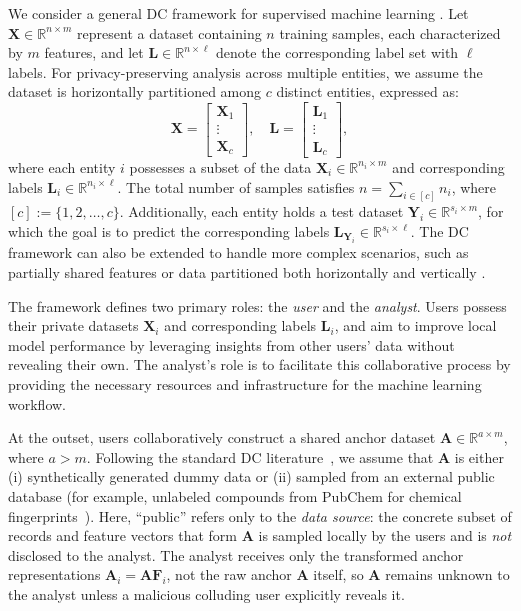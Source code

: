 \documentclass[final,3p,times]{elsarticle}
\theoremstyle{plain}
\newcommand{\matr}[1]{\bm{#1}}        %
\begin{document}
We consider a general DC framework for supervised machine learning \cite{DCframework1, DC-DP}. Let \( \matr{X} \in \mathbb{R}^{n \times m} \) represent a dataset containing \( n \) training samples, each characterized by \( m \) features, and let \( \matr{L} \in \mathbb{R}^{n \times \ell} \) denote the corresponding label set with \( \ell \) labels. For privacy-preserving analysis across multiple entities, we assume the dataset is horizontally partitioned among \( c \) distinct entities, expressed as:
\begin{equation}
\matr{X} = \begin{bmatrix}
\matr{X}_1 \\
\vdots \\
\matr{X}_c
\end{bmatrix}, \quad
\matr{L} = \begin{bmatrix}
\matr{L}_1 \\
\vdots \\ 
\matr{L}_c
\end{bmatrix},
\end{equation}
where each entity \( i \) possesses a subset of the data \( \matr{X}_i \in \mathbb{R}^{n_i \times m} \) and corresponding labels \( \matr{L}_i \in \mathbb{R}^{n_i \times \ell} \). The total number of samples satisfies \( n = \sum_{i \in [c]} n_i \), where \([c] := \{1, 2, \ldots, c\}\). Additionally, each entity holds a test dataset \( \matr{Y}_i \in \mathbb{R}^{s_i \times m} \), for which the goal is to predict the corresponding labels \( \matr{L}_{\matr{Y}_i} \in \mathbb{R}^{s_i \times \ell} \). The DC framework can also be extended to handle more complex scenarios, such as partially shared features \cite{DCfeatures} or data partitioned both horizontally and vertically \cite{DCframework2}.

The framework defines two primary roles: the \textit{user} and the \textit{analyst}. Users possess their private datasets \( \matr{X}_i \) and corresponding labels \( \matr{L}_i \), and aim to improve local model performance by leveraging insights from other users' data without revealing their own. The analyst's role is to facilitate this collaborative process by providing the necessary resources and infrastructure for the machine learning workflow.

At the outset, users collaboratively construct a shared anchor dataset $\matr{A} \in \mathbb{R}^{a \times m}$, where $a > m$. Following the standard DC literature~\cite{DCframework1, DCnoniid}, we assume that $\matr{A}$ is either (i) synthetically generated dummy data or (ii) sampled from an external public database (for example, unlabeled compounds from PubChem for chemical fingerprints~\cite{DCnoniid}). Here, “public” refers only to the \emph{data source}: the concrete subset of records and feature vectors that form $\matr{A}$ is sampled locally by the users and is \emph{not} disclosed to the analyst. The analyst receives only the transformed anchor representations $\matr{A}_i = \matr{A} \matr{F}_i$, not the raw anchor $\matr{A}$ itself, so $\matr{A}$ remains unknown to the analyst unless a malicious colluding user explicitly reveals it.
\end{document}
